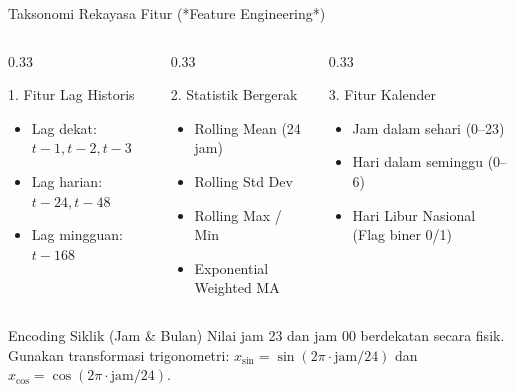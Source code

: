 \documentclass[aspectratio=169, 10pt]{beamer}
\begin{document}
\begin{frame}{Taksonomi Rekayasa Fitur (*Feature Engineering*)}
    \begin{columns}[T]
        \begin{column}{0.33\textwidth}
            \begin{block}{1. Fitur Lag Historis}
                \begin{itemize}
                    \item Lag dekat: $t-1, t-2, t-3$
                    \item Lag harian: $t-24, t-48$
                    \item Lag mingguan: $t-168$
                \end{itemize}
            \end{block}
        \end{column}
        \begin{column}{0.33\textwidth}
            \begin{block}{2. Statistik Bergerak}
                \begin{itemize}
                    \item Rolling Mean (24 jam)
                    \item Rolling Std Dev
                    \item Rolling Max / Min
                    \item Exponential Weighted MA
                \end{itemize}
            \end{block}
        \end{column}
        \begin{column}{0.33\textwidth}
            \begin{block}{3. Fitur Kalender}
                \begin{itemize}
                    \item Jam dalam sehari (0--23)
                    \item Hari dalam seminggu (0--6)
                    \item Hari Libur Nasional (Flag biner 0/1)
                \end{itemize}
            \end{block}
        \end{column}
    \end{columns}
    \vspace{0.2cm}
    \begin{alertblock}{Encoding Siklik (Jam \& Bulan)}
        Nilai jam 23 dan jam 00 berdekatan secara fisik. Gunakan transformasi trigonometri:
        $x_{\sin} = \sin(2\pi \cdot \text{jam} / 24)$ dan $x_{\cos} = \cos(2\pi \cdot \text{jam} / 24)$.
    \end{alertblock}
\end{frame}
\end{document}
